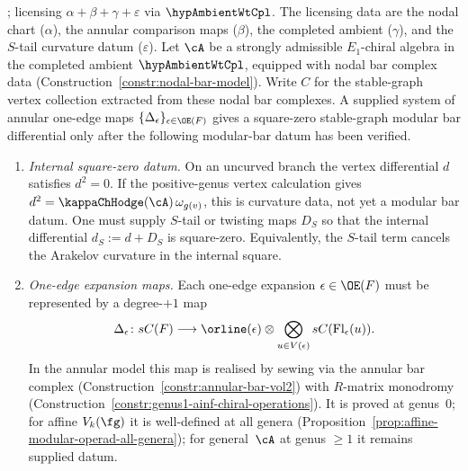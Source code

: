 \begin{proposition}
\ClaimStatusProvedHere; licensing
$\alpha+\beta+\gamma+\varepsilon$ via \(\hypAmbientWtCpl\).
\label{prop:ainf-chiral-modular-bar-reduction}
\noindent The licensing data are the nodal chart
\textup{(}$\alpha$\textup{)}, the annular comparison maps
\textup{(}$\beta$\textup{)}, the completed ambient
\textup{(}$\gamma$\textup{)}, and the \(S\)-tail curvature datum
\textup{(}$\varepsilon$\textup{)}.
%
%
%
Let $\cA$ be a strongly admissible $E_1$-chiral algebra in the
completed ambient \(\hypAmbientWtCpl\), equipped with nodal bar
complex data
\textup{(}Construction~\textup{\ref{constr:nodal-bar-model}}\textup{)}.
Write \(C\) for the stable-graph vertex collection extracted from
these nodal bar complexes.  A supplied system of annular one-edge maps
\(\{\Delta_\epsilon\}_{\epsilon\in\OE(F)}\) gives a square-zero
stable-graph modular bar differential only after the following
modular-bar datum has been verified.
\begin{enumerate}[label=\textup{(\alph*)}]
\item \emph{Internal square-zero datum.}
 On an uncurved branch the vertex differential \(d\) satisfies
 \(d^2=0\).  If the positive-genus vertex calculation gives
 \(d^2=\kappaChHodge(\cA)\,\omega_{g(v)}\), this is curvature data,
 not yet a modular bar datum.  One must supply \(S\)-tail or twisting
 maps \(D_S\) so that the internal differential
 \(d_S:=d+D_S\) is square-zero.  Equivalently, the \(S\)-tail term
 cancels the Arakelov curvature in the internal square.
\item \emph{One-edge expansion maps.}
 Each one-edge expansion \(\epsilon\in\OE(F)\) must be represented by
 a degree-\(+1\) map
 \[
  \Delta_\epsilon\colon
  sC(F)\longrightarrow
  \orline(\epsilon)\otimes
  \bigotimes_{u\in V(\epsilon)}sC(\mathrm{Fl}_\epsilon(u)).
 \]
 In the annular model this map is realised by sewing via the
 annular bar complex
 \textup{(}Construction~\textup{\ref{constr:annular-bar-vol2}}\textup{)}
 with $R$-matrix monodromy
 \textup{(}Construction~\textup{\ref{constr:genus1-ainf-chiral-operations}}\textup{)}.
 It is proved at genus~$0$; for affine $V_k(\fg)$ it is
 well-defined at all genera
 \textup{(}Proposition~\textup{\ref{prop:affine-modular-operad-all-genera}}\textup{)};
 for general~\(\cA\) at genus \(\ge1\) it remains supplied datum.

\end{enumerate}
\end{proposition}
